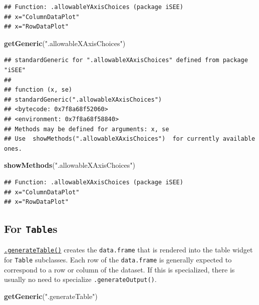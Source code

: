 \documentclass[
]{book}
\newenvironment{Shaded}{\begin{snugshade}}{\end{snugshade}}
\newcommand{\KeywordTok}[1]{\textcolor[rgb]{0.13,0.29,0.53}{\textbf{#1}}}
\newcommand{\NormalTok}[1]{#1}
\newcommand{\StringTok}[1]{\textcolor[rgb]{0.31,0.60,0.02}{#1}}
\begin{document}
\begin{verbatim}
## Function: .allowableYAxisChoices (package iSEE)
## x="ColumnDataPlot"
## x="RowDataPlot"
\end{verbatim}

\begin{Shaded}
\begin{Highlighting}[]
\KeywordTok{getGeneric}\NormalTok{(}\StringTok{".allowableXAxisChoices"}\NormalTok{)}
\end{Highlighting}
\end{Shaded}

\begin{verbatim}
## standardGeneric for ".allowableXAxisChoices" defined from package "iSEE"
## 
## function (x, se) 
## standardGeneric(".allowableXAxisChoices")
## <bytecode: 0x7f8a68f52060>
## <environment: 0x7f8a68f58840>
## Methods may be defined for arguments: x, se
## Use  showMethods(".allowableXAxisChoices")  for currently available ones.
\end{verbatim}

\begin{Shaded}
\begin{Highlighting}[]
\KeywordTok{showMethods}\NormalTok{(}\StringTok{".allowableXAxisChoices"}\NormalTok{)}
\end{Highlighting}
\end{Shaded}

\begin{verbatim}
## Function: .allowableXAxisChoices (package iSEE)
## x="ColumnDataPlot"
## x="RowDataPlot"
\end{verbatim}

\hypertarget{for-tables}{%
\subsection{\texorpdfstring{For \texttt{Table}s}{For Tables}}\label{for-tables}}

\href{https://isee.github.io/iSEE/reference/table-generics.html}{\texttt{.generateTable()}} creates the \texttt{data.frame} that is rendered into the table widget for \texttt{Table} subclasses.
Each row of the \texttt{data.frame} is generally expected to correspond to a row or column of the dataset.
If this is specialized, there is usually no need to specialize \texttt{.generateOutput()}.

\begin{Shaded}
\begin{Highlighting}[]
\KeywordTok{getGeneric}\NormalTok{(}\StringTok{".generateTable"}\NormalTok{)}
\end{Highlighting}
\end{Shaded}
\end{document}
